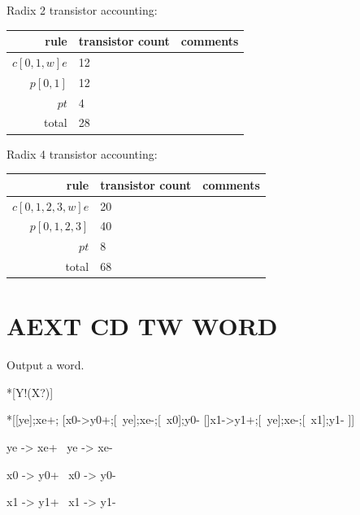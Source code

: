\documentclass{article}
\begin{document}
\noindent
Radix 2 transistor accounting:

\begin{center}
    \begin{tabular}{|r|l|l|}
    \hline
    rule & transistor count & comments \\ \hline
    $c[0,1,w]e$ & 12 & \\ \hline
    $p[0,1]$ & 12 & \\ \hline
    $pt$ & 4 & \\ \hline
    \hline total & 28 & \\ \hline
    \end{tabular}
\end{center}

\noindent
Radix 4 transistor accounting:

\begin{center}
    \begin{tabular}{|r|l|l|}
    \hline
    rule & transistor count & comments \\ \hline
    $c[0,1,2,3,w]e$ & 20 & \\ \hline
    $p[0,1,2,3]$ & 40 & \\ \hline
    $pt$ & 8 & \\ \hline
    \hline total & 68 & \\ \hline
    \end{tabular}
\end{center}

\section{AEXT CD TW WORD \label{sec:AEXT_CD_TW_WORD}}

Output a word.

\begin{csp}
*[Y!(X?)]
\end{csp}

\begin{hse}
*[[ye];xe+;
  [x0->y0+;[~ye];xe-;[~x0];y0-
  []x1->y1+;[~ye];xe-;[~x1];y1-
 ]]
\end{hse}

\begin{prs2}
ye -> xe+
~ye -> xe-
\end{prs2}

\begin{prs2}
x0 -> y0+
~x0 -> y0-

x1 -> y1+
~x1 -> y1-
\end{prs2}
\end{document}
